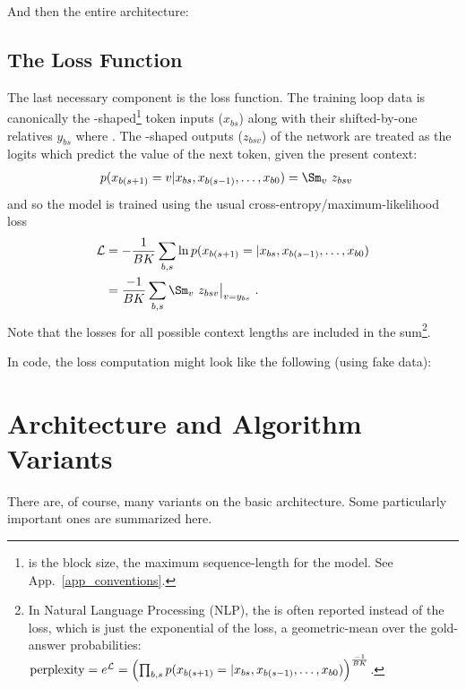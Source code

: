\documentclass[11pt]{article}
\begin{document}
And then the entire architecture: 


\subsection{The Loss Function}

The last necessary component is the loss function. The training loop data is canonically the
-shaped\footnote{ is the block size, the maximum sequence-length for
	the model. See App.~\ref{app_conventions}.}  token inputs ($ x _{ bs } $) along with their shifted-by-one relatives $ y
		_{ bs }$ where .  The -shaped
outputs ($ z _{ bsv } $)  of the  network are treated as the logits which
predict the value of the next token, given the present context:
\begin{align}
	p(x _{ b (s+1) }=v| x _{ b s }, x _{ b (s-1) }, \ldots, x _{ b 0 }) & = \Sm _{ v }\ z _{ bsv
		}\label{eq_transformer_conditional_prob}
\end{align}
and so the model is trained using the usual cross-entropy/maximum-likelihood loss
\begin{align}
	\Lcal & = -\frac{ 1 }{ BK }\sum _{ b,s }\ln p(x _{ b (s+1) }=| x _{ b s }, x _{ b (s-1) },
	\ldots, x _{ b 0 })\nn
	      & = \frac{- 1 }{ BK }\sum _{ b,s }\Sm _{ v }\ z _{ bsv}\big| _{ v=y _{ bs } } \ .
\end{align}
Note that the losses for all possible context lengths are included in the sum\footnote{In Natural Language Processing (NLP),
	the  is often reported instead of the loss, which is just the exponential of the loss, a geometric-mean over the
	gold-answer probabilities: $ {\rm perplexity} = e^{ \mathcal{L} } =\left (\prod _{ b, s }p(x _{ b (s+1) }=| x _{ b s }, x _{ b (s-1) },
		\ldots, x _{ b 0 })\right ) ^{ \frac{ -1 }{ BK } }$.}.

In 
code, the loss computation might look like the following (using fake data):


\section{Architecture and Algorithm Variants}

There are, of course, many variants on the basic architecture. Some particularly important ones are
summarized here.
\end{document}
